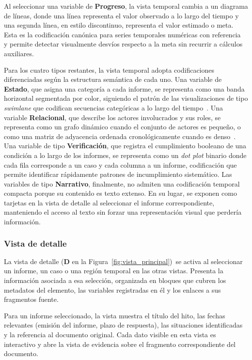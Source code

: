 Al seleccionar una variable de \textbf{Progreso}, la 
vista temporal cambia a un diagrama de líneas, donde una 
línea representa el valor observado a lo largo del 
tiempo y una segunda línea, en estilo discontinuo, 
representa el valor estimado o meta. Esta es la 
codificación canónica para series temporales numéricas 
con referencia~\cite{cleveland1985elements} y permite 
detectar visualmente desvíos respecto a la meta sin 
recurrir a cálculos auxiliares.

Para los cuatro tipos restantes, la vista temporal adopta 
codificaciones diferenciadas según la estructura semántica 
de cada uno. Una variable de \textbf{Estado}, que asigna 
una categoría a cada informe, se representa como una 
banda horizontal segmentada por color, siguiendo el 
patrón de las visualizaciones de tipo \textit{swimlane} 
que codifican secuencias categóricas a lo 
largo del tiempo~\cite{wongsuphasawat2011lifeflow}. Una 
variable \textbf{Relacional}, que describe los actores 
involucrados y sus roles, se representa como un grafo 
dinámico cuando el conjunto de actores es pequeño, o 
como una matriz de adyacencia ordenada cronológicamente 
cuando es 
denso~\cite{beck2017taxonomy}. Una variable de tipo 
\textbf{Verificación}, que registra el cumplimiento 
booleano de una condición a lo largo de los informes, se 
representa como un \textit{dot plot} binario donde cada 
fila corresponde a un caso y cada columna a un informe, 
codificación que permite identificar rápidamente patrones 
de incumplimiento sistemático. Las variables de tipo 
\textbf{Narrativo}, finalmente, no admiten una 
codificación temporal compacta porque su contenido es 
texto extenso. En su lugar, se exponen como tarjetas en 
la vista de detalle al seleccionar el informe 
correspondiente, manteniendo el acceso al texto sin 
forzar una representación visual que perdería 
información.

\subsubsection{Vista de detalle}

La vista de detalle (\textbf{D} en la 
Figura~\ref{fig:vista_principal})~se activa al 
seleccionar un informe, un caso o una región temporal en 
las otras vistas. Presenta la información asociada a esa 
selección, organizada en bloques que cubren los 
metadatos del elemento, las variables registradas en él 
y los enlaces a sus fragmentos fuente.

Para un informe seleccionado, la vista muestra el título 
del hito, las fechas relevantes (emisión del informe, 
plazo de respuesta), las situaciones identificadas y la 
referencia al documento original. Cada dato visible en 
esta vista es interactivo y abre la vista de evidencia 
sobre el fragmento correspondiente del documento.


